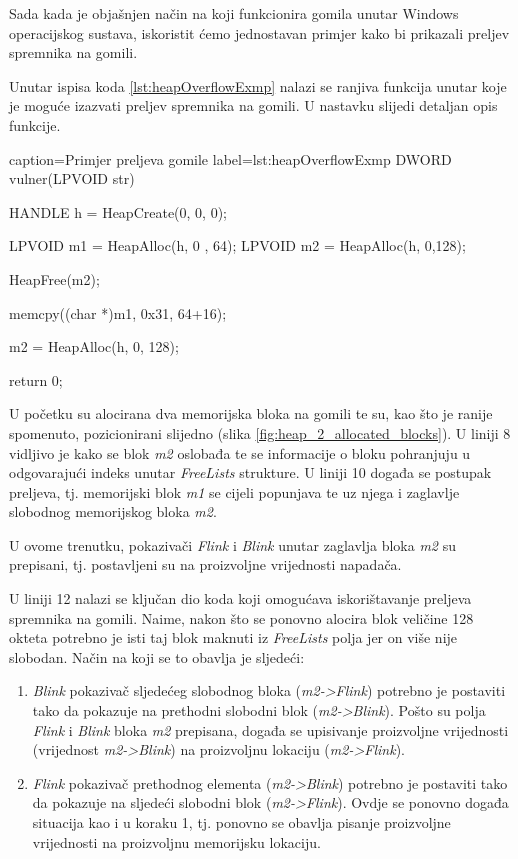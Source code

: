 \documentclass[times, utf8, diplomski, numeric]{fer}
\begin{document}
Sada kada je objašnjen način na koji funkcionira gomila unutar
Windows operacijskog sustava, iskoristit ćemo jednostavan primjer
kako bi prikazali preljev spremnika na gomili.

Unutar ispisa koda \ref{lst:heapOverflowExmp} nalazi se ranjiva
funkcija unutar koje je moguće izazvati preljev spremnika na
gomili. U nastavku slijedi detaljan opis funkcije.

\begin{ispis} {caption=Primjer preljeva gomile} {label=lst:heapOverflowExmp}
DWORD vulner(LPVOID str)
{
    HANDLE h = HeapCreate(0, 0, 0);
 
    LPVOID m1 = HeapAlloc(h, 0 , 64);
    LPVOID m2 = HeapAlloc(h, 0,128);
 
    HeapFree(m2);

    memcpy((char *)m1, 0x31, 64+16);
 
    m2 = HeapAlloc(h, 0, 128);
 
    return 0;
}
\end{ispis}

U početku su alocirana dva memorijska bloka na gomili te su, kao
što je ranije spomenuto, pozicionirani slijedno 
(slika \ref{fig:heap_2_allocated_blocks}). U liniji 8 vidljivo je kako			%
se blok \emph{m2} oslobađa te se informacije o bloku pohranjuju u
odgovarajući indeks unutar \emph{FreeLists} strukture.	U liniji			%
10 događa se postupak preljeva, tj. memorijski blok \emph{m1} se
cijeli popunjava te uz njega i zaglavlje slobodnog memorijskog
bloka \emph{m2}.

U ovome trenutku, pokazivači \emph{Flink} i \emph{Blink} unutar
zaglavlja bloka \emph{m2} su prepisani, tj. postavljeni su na
proizvoljne vrijednosti napadača.

U liniji 12 nalazi se ključan dio koda koji omogućava
iskorištavanje preljeva spremnika na gomili. Naime, nakon što se
ponovno alocira blok veličine 128 okteta potrebno je isti taj
blok maknuti iz \emph{FreeLists} polja jer on više nije slobodan.
Način na koji se to obavlja je sljedeći:

\begin{enumerate}

\item \emph{Blink} pokazivač sljedećeg slobodnog bloka 
(\emph{m2->Flink}) potrebno je postaviti tako da pokazuje na
prethodni slobodni blok (\emph{m2->Blink}). Pošto su polja
\emph{Flink} i \emph{Blink} bloka \emph{m2} prepisana, događa se
upisivanje proizvoljne vrijednosti (vrijednost \emph{m2->Blink})
na proizvoljnu lokaciju (\emph{m2->Flink}).

\item \emph{Flink} pokazivač prethodnog elementa 
(\emph{m2->Blink}) potrebno je postaviti tako da pokazuje na
sljedeći slobodni blok (\emph{m2->Flink}). Ovdje se ponovno
događa situacija kao i u koraku 1, tj. ponovno se obavlja pisanje
proizvoljne vrijednosti na proizvoljnu memorijsku lokaciju.

\end{enumerate}
\end{document}

